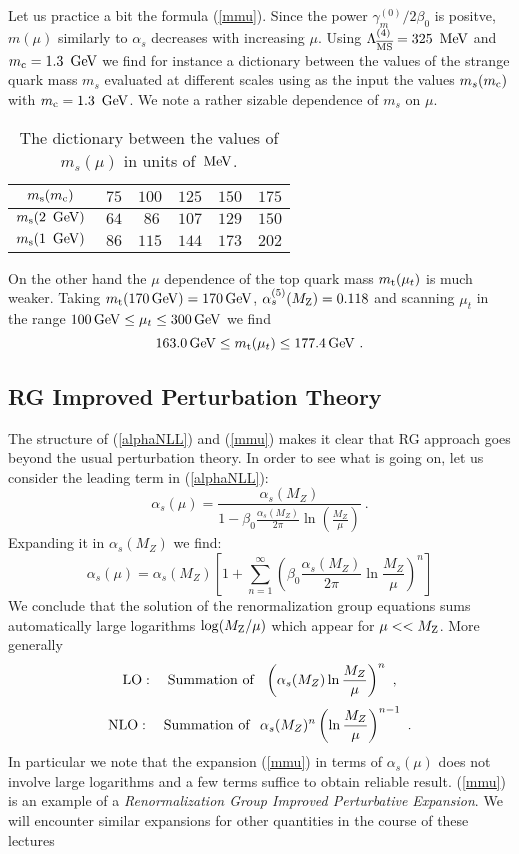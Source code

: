 \documentclass[12pt]{article}
\def\as{\alpha_s}
\newcommand{\mt}{m_{\rm t}}
\newcommand{\mc}{m_{\rm c}}
\newcommand{\ms}{m_{\rm s}}
\newcommand{\mz}{M_{\rm Z}}
\newcommand{\gev}{\, {\rm GeV}}
\newcommand{\mev}{\, {\rm MeV}}
\newcommand{\Lms}{\Lambda_{\overline{\rm MS}}}
\newcommand{\be}{\begin{equation}}
\newcommand{\ee}{\end{equation}}
\begin{document}
\begin{itemize}
\begin{itemize}
Let us practice a bit the formula (\ref{mmu}). Since the power
$\gamma^{(0)}_m/2\beta_0$ is positve, $m(\mu)$ similarly to $\alpha_s$
decreases with increasing $\mu$. 
Using  $\Lms^{(4)}=325~\mev$ and
$\mc=1.3~\gev$ we find for instance a dictionary between the values
of the strange quark mass $m_s$ evaluated at different scales
using as the input the values $m_s(\mc)$ with $\mc=1.3~\gev$. 
We note a rather
sizable dependence of $m_s$ on $\mu$.
\begin{table}[thb]
\caption[]{The dictionary between the values of $m_s(\mu)$ 
in units of $\mev$.
\label{tab:ms}}
\begin{center}
\begin{tabular}{|c|c|c|c|c|c|}\hline
  $\ms(\mc)$& $ ~75$& $100$& $125$ & $150$ &  $175$ \\ \hline
 $\ms(2~\gev)$& $ ~64$& $~86$& $107$ & $129$ &  $150$ \\ \hline
 $\ms(1~\gev)$& $ ~86$& $115$& $144$ & $173$ &  $202$ \\ \hline
 \end{tabular}
\end{center}
\end{table}

On the other hand the $\mu$ dependence of the top quark mass 
$\mt(\mu_t)$ is much weaker. Taking
$\mt(170\gev) = 170\gev$,  $\alpha_s^{(5)}(\mz)=0.118$ and
scanning $\mu_t$ in the range  $100\gev\le \mu_t \le 300\gev$
we find 
\be
163.0\gev\le \mt(\mu_t)\le 177.4\gev~.
\ee

\subsection{RG Improved Perturbation Theory}
The structure of (\ref{alphaNLL}) and (\ref{mmu})
makes it clear that RG approach goes
 beyond the usual perturbation theory. In order to see what is going on,
let us consider the leading term in (\ref{alphaNLL}):
\be \label{alphaLO}
\as(\mu) = \frac{\as(M_Z)}{1 - \beta_0 \frac{\as(M_Z)}{2 \pi} 
\ln \left( \frac{M_Z}{\mu} \right)}~.
\ee
Expanding it  in $\as(M_Z)$ we find:
\be \label{EXPLO}
\as(\mu) = \as(M_Z)\left[1 +\sum_{n=1}^\infty
\left( \beta_0 \frac{\as(M_Z)}{2 \pi} 
\ln \frac{M_Z}{\mu}\right)^n\right]  
\ee
We conclude that the
solution of the renormalization group equations sums automatically 
large logarithms $ \log (\mz/\mu) $ which appear for $ \mu<<\mz $.
More generally
\be
 {\rm LO}:\quad {\rm Summation~of}~~
 \left(\as(M_Z)\ln \frac{M_Z}{\mu}\right)^n~,
\ee
\be
{\rm  NLO}:\quad {\rm Summation~ of}~~
 \as(M_Z)^n\left(\ln \frac{M_Z}{\mu}\right)^{n-1}~.
\ee
In particular we note that
the expansion (\ref{mmu}) in terms of 
$\as(\mu)$ does not
involve large logarithms and a few terms suffice to obtain reliable
result. 
(\ref{mmu}) is an example of a
{\it Renormalization Group Improved Perturbative Expansion}.
We will encounter similar expansions for other quantities in the
course of these lectures

\end{itemize}
\end{itemize}
\end{document}
